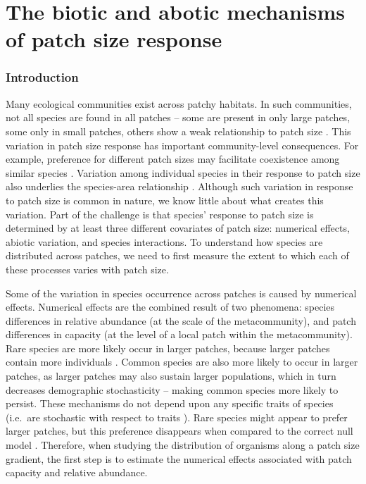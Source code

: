 \chapter{The biotic and abotic mechanisms of patch size response}
\label{chap:astar}

\subsection{Introduction}\label{introduction}

Many ecological communities exist across patchy habitats. In such
communities, not all species are found in all patches -- some are
present in only large patches, some only in small patches, others show a
weak relationship to patch size \citep{Taylor1991, Lomolino2000}. This
variation in patch size response has important community-level
consequences. For example, preference for different patch sizes may
facilitate coexistence among similar species \citep{Gilbert2008}.
Variation among individual species in their response to patch size also
underlies the species-area relationship \citep{Ovaskainen2003}. Although
such variation in response to patch size is common in nature, we know
little about what creates this variation. Part of the challenge is that
species' response to patch size is determined by at least three
different covariates of patch size: numerical effects, abiotic
variation, and species interactions. To understand how species are
distributed across patches, we need to first measure the extent to which
each of these processes varies with patch size.

Some of the variation in species occurrence across patches is caused by
numerical effects. Numerical effects are the combined result of two
phenomena: species differences in relative abundance (at the scale of
the metacommunity), and patch differences in capacity (at the level of a
local patch within the metacommunity). Rare species are more likely
occur in larger patches, because larger patches contain more individuals
\citep{Wright1991}. Common species are also more likely to occur in
larger patches, as larger patches may also sustain larger populations,
which in turn decreases demographic stochasticity -- making common
species more likely to persist. These mechanisms do not depend upon any
specific traits of species (i.e.~are stochastic with respect to traits
\citep{Vellend2014}). Rare species might appear to prefer larger
patches, but this preference disappears when compared to the correct
null model \citep{Srivastava2008}. Therefore, when studying the
distribution of organisms along a patch size gradient, the first step is
to estimate the numerical effects associated with patch capacity and
relative abundance.

